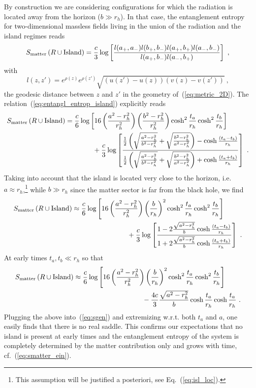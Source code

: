 \documentclass[a4paper, 12pt]{article}
\def\be{\begin{equation}}
\def\ee{\end{equation}}
\begin{document}
By construction we are considering configurations for which the radiation is located away from the horizon ($b\gg r_h$). 
In that case, the entanglement entropy for two-dimensional massless fields living in the union of the radiation and the island regimes reads~\cite{Huerta1,Calabrese:2009ez,*Calabrese:2010he,Hashimoto:2020cas,Alishahiha:2020qza}
\be
\label{eq:entangl_entrop_island}
S_{\rm matter}\left(R\cup\text{Island}\right)= \frac{c}{3}\log\left[\frac{l(a_+,a_-)l(b_+,b_-)l(a_+,b_+)l(a_-,b_-)}{l(a_+,b_-)l(a_-,b_+)} \right] \ , 
\ee
with 
\be
l(z,z') = e^{\rho(z)}e^{\rho(z')}\sqrt{(u(z')-u(z))(v(z)-v(z'))} \ ,
\ee
the geodesic distance between $z$ and $z'$ in the geometry of~(\ref{eq:metric_2D}). 
The relation~(\ref{eq:entangl_entrop_island}) explicitly reads
\be
\begin{aligned}
S_{\rm matter}\left(R\cup\text{Island}\right) &= \frac c 6 \log \left[ 16\left(\frac{a^2-r_h^2}{r_h^2}\right)\left(\frac{b^2-r_h^2}{r_h^2}\right)\cosh^2 \frac{t_a}{r_h}\cosh^2 \frac{t_b}{r_h} \right] \\
&\qquad\qquad+\frac c 3 \log\left[\frac{\frac 1 2 \left(\sqrt{\frac{a^2-r_h^2}{b^2-r_h^2}} +\sqrt{\frac{b^2-r_h^2}{a^2-r_h^2}}\right) -\cosh\frac{(t_a-t_b)}{r_h}}{\frac 1 2 \left(\sqrt{\frac{a^2-r_h^2}{b^2-r_h^2}} +\sqrt{\frac{b^2-r_h^2}{a^2-r_h^2}}\right) +\cosh\frac{(t_a+t_b)}{r_h}}\right]\ . 
\end{aligned}
\ee
Taking into account that the island is located very close to the horizon, i.e. $a\approx r_h$,\footnote{This assumption will be justified a posteriori, see Eq.~(\ref{eq:isl_loc}).} while $b\gg r_h$ since the matter sector is far from the black hole, we find
\be
\begin{aligned}
S_{\rm matter}\left(R\cup\text{Island}\right) &\approx \frac c 6 \log \left[ 16\left(\frac{a^2-r_h^2}{r_h^2}\right)\left(\frac{b}{r_h}\right)^2\cosh^2 \frac{t_a}{r_h}\cosh^2 \frac{t_b}{r_h} \right] \\
&\qquad\qquad\qquad\qquad+\frac c 3 \log\left[\frac{1 -2\frac{\sqrt{a^2-r_h^2}}{b}\cosh\frac{(t_a-t_b)}{r_h}}{1 +2\frac{\sqrt{a^2-r_h^2}}{b}\cosh\frac{(t_a+t_b)}{r_h}}\right]\ . 
\end{aligned}
\ee
At early times $t_a,t_b\ll r_h$ so that  
\be
\begin{aligned}
S_{\rm matter}\left(R\cup\text{Island}\right) &\approx \frac c 6 \log \left[ 16\left(\frac{a^2-r_h^2}{r_h^2}\right)\left(\frac{b}{r_h}\right)^2\cosh^2 \frac{t_a}{r_h}\cosh^2\frac{t_b}{r_h} \right] \\
&\qquad\qquad\qquad\qquad\qquad-\frac {4c}{3}\frac{\sqrt{a^2-r_h^2}}{b} \cosh\frac{t_a}{r_h} \cosh \frac{t_a}{r_h} \ .
\end{aligned}
\ee
Plugging the above into~(\ref{eq:sgen}) and extremizing w.r.t. both  $t_a$ and $a$, one easily finds that there is no real saddle. This confirms our expectations that no island is present at early times and the entanglement entropy of the system is completely determined by the matter contribution only and grows with time, cf.~(\ref{eq:smatter_ein}). 
\end{document}
